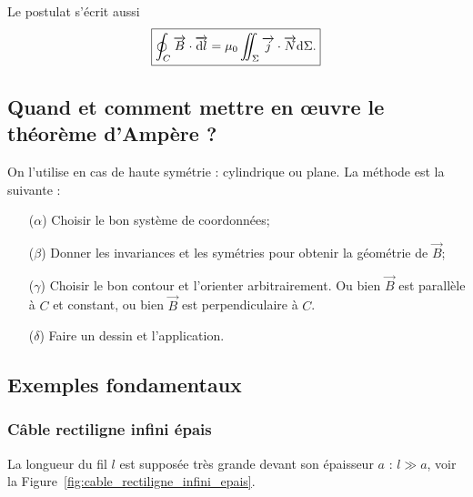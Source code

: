         Le postulat s'écrit aussi
        \begin{equation}
            \boxed{
                \oint_{C}\protect\overrightarrow{{B}}\cdot\protect\overrightarrow{{\mathrm{d} l}}=\mu_{0}\iint_{\Sigma}\protect\overrightarrow{{j}}\cdot\protect\overrightarrow{{N}}\mathrm{d}\Sigma.
            }
        \end{equation}

    \subsection{Quand et comment mettre en œuvre le théorème d'Ampère ?}

        On l'utilise en cas de haute symétrie : cylindrique ou plane. La méthode est la suivante :
        \begin{enumerate}
            \item [($\alpha$)] Choisir le bon système de coordonnées;
            \item [($\beta$)] Donner les invariances et les symétries pour obtenir la géométrie de $\vec{B}$;
            \item [($\gamma$)] Choisir le bon contour et l'orienter arbitrairement. Ou bien $\vec{B}$ est parallèle à $C$ et constant, ou bien $\vec{B}$ est perpendiculaire à $C$.
            \item [($\delta$)] Faire un dessin et l'application.
        \end{enumerate}

    \subsection{Exemples fondamentaux}
        \subsubsection{Câble rectiligne infini épais}

            La longueur du fil $l$ est supposée très grande devant son épaisseur $a$ : $l\gg a$, voir la Figure~\ref{fig:cable_rectiligne_infini_epais}.

